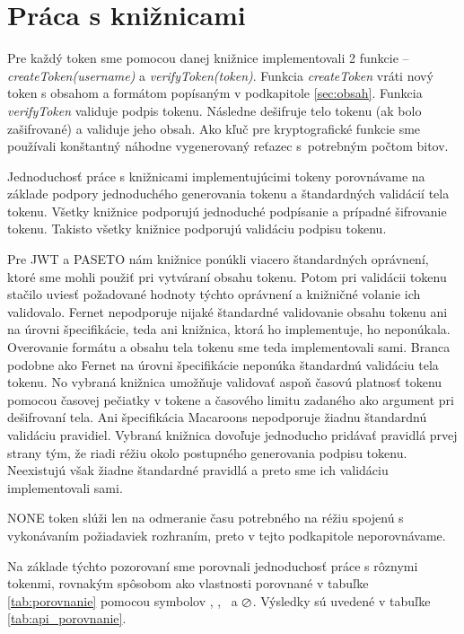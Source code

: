 \section{Práca s knižnicami}

Pre každý token sme pomocou danej knižnice implementovali 2 funkcie -- \textit{createToken(username)} a \textit{verifyToken(token)}. Funkcia \textit{createToken} vráti nový token s obsahom a formátom popísaným v podkapitole \ref{sec:obsah}. Funkcia \textit{verifyToken} validuje podpis tokenu. Následne dešifruje telo tokenu (ak bolo zašifrované) a validuje jeho obsah. Ako kľuč pre kryptografické funkcie sme používali konštantný náhodne vygenerovaný reťazec s~potrebným počtom bitov.

Jednoduchosť práce s knižnicami implementujúcimi tokeny porovnávame na základe podpory jednoduchého generovania tokenu a štandardných validácií tela tokenu.
Všetky knižnice podporujú jednoduché podpísanie a prípadné šifrovanie tokenu. Takisto všetky knižnice podporujú validáciu podpisu tokenu. 

Pre JWT a PASETO nám knižnice ponúkli viacero štandardných oprávnení, ktoré sme mohli použiť pri vytváraní obsahu tokenu. Potom pri validácii tokenu stačilo uviesť požadované hodnoty týchto oprávnení a knižničné volanie ich validovalo. Fernet nepodporuje nijaké štandardné validovanie obsahu tokenu ani na úrovni špecifikácie, teda ani knižnica, ktorá ho implementuje, ho neponúkala. Overovanie formátu a obsahu tela tokenu sme teda implementovali sami. Branca podobne ako Fernet na úrovni špecifikácie neponúka štandardnú validáciu tela tokenu. No vybraná knižnica umožňuje validovať aspoň časovú platnosť tokenu pomocou časovej pečiatky v tokene a časového limitu zadaného ako argument pri dešifrovaní tela. Ani špecifikácia Macaroons nepodporuje žiadnu štandardnú validáciu pravidiel. Vybraná knižnica dovoľuje jednoducho pridávať pravidlá prvej strany tým, že riadi réžiu okolo postupného generovania podpisu tokenu. Neexistujú však žiadne štandardné pravidlá a preto sme ich validáciu implementovali sami.

NONE token slúži len na odmeranie času potrebného na réžiu spojenú s vykonávaním požiadaviek rozhraním, preto v tejto podkapitole neporovnávame.

Na základe týchto pozorovaní sme porovnali jednoduchosť práce s rôznymi tokenmi, rovnakým spôsobom ako vlastnosti porovnané v tabuľke \ref{tab:porovnanie} pomocou symbolov \CIRCLE, \LEFTcircle, \Circle ~a $\varoslash$. Výsledky sú uvedené v tabuľke \ref{tab:api_porovnanie}.


